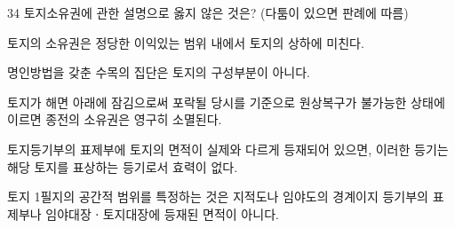 \begin{question}{34}
토지소유권에 관한 설명으로 옳지 않은 것은? (다툼이 있으면 판례에 따름)
\begin{choices}
  \item 토지의 소유권은 정당한 이익있는 범위 내에서 토지의 상하에 미친다.
  \item 명인방법을 갖춘 수목의 집단은 토지의 구성부분이 아니다.
  \item 토지가 해면 아래에 잠김으로써 포락될 당시를 기준으로 원상복구가 불가능한 상태에 이르면 종전의 소유권은 영구히 소멸된다.
  \item 토지등기부의 표제부에 토지의 면적이 실제와 다르게 등재되어 있으면, 이러한 등기는 해당 토지를 표상하는 등기로서 효력이 없다.
  \item 토지 1필지의 공간적 범위를 특정하는 것은 지적도나 임야도의 경계이지 등기부의 표제부나 임야대장ㆍ토지대장에 등재된 면적이 아니다.
\end{choices}
\end{question}
